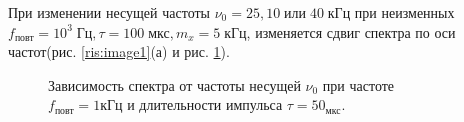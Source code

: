 \documentclass[a4paper, 12pt,twoside]{article}
\begin{document}
При изменении несущей частоты  $\nu_0 = 25, 10 \; \text{или} \; 40\; \text{кГц}$ при неизменных $f_\text{повт} = 10^3 \; \text{Гц}, \tau = 100 \; \text{мкс}, m_x = 5 \; \text{кГц}$, изменяется сдвиг спектра по оси частот(рис. \ref{ris:image1}(а) и рис. \ref{ris:image2}).


\begin{figure}[H]
	\centering
	
	\begin{minipage}[h]{0.49\linewidth}
	\end{minipage}
	\begin{minipage}[h]{0.49\linewidth}
	\end{minipage}
	
	\caption{Зависимость спектра от частоты несущей $\nu_{0}$ при частоте $f_{\text{повт}} = 1\text{кГц}$ и длительности импульса $\tau = 50_{\text{мкс}}$.}
	\label{ris:image2}
\end{figure}
\end{document}
